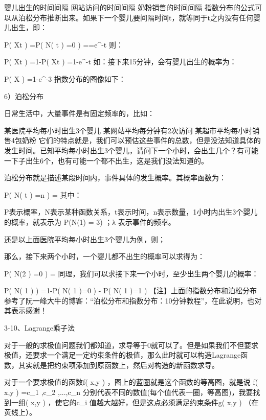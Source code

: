 \documentclass[11pt]{book}
\newcounter{#2}
\newcounter{#2}[#1]
\numberwithin{#2}{#1}
\begin{document}
婴儿出生的时间间隔
网站访问的时间间隔
奶粉销售的时间间隔 
指数分布的公式可以从泊松分布推断出来。如果下一个婴儿要间隔时间t，就等同于t之内没有任何婴儿出生，即：

P\left( X\geq t \right) =P\left( N\left( t \right) =0 \right) ==e^{-\lambda t} 
则：

P\left( X\leq t \right) =1-P\left( X\geq t \right) =1-e^{-\lambda t} 
如：接下来15分钟，会有婴儿出生的概率为：

P\left( X\leq {} \right) =1-e^{-3\cdot {} } 
指数分布的图像如下：


6）泊松分布

日常生活中，大量事件是有固定频率的，比如：

某医院平均每小时出生3个婴儿
某网站平均每分钟有2次访问
某超市平均每小时销售4包奶粉 
它们的特点就是，我们可以预估这些事件的总数，但是没法知道具体的发生时间。已知平均每小时出生3个婴儿，请问下一个小时，会出生几个？有可能一下子出生6个，也有可能一个都不出生，这是我们没法知道的。

泊松分布就是描述某段时间内，事件具体的发生概率。其概率函数为：

P\left( N\left( t \right) =n \right) = 
其中：

P表示概率，N表示某种函数关系，t表示时间，n表示数量，1小时内出生3个婴儿的概率，就表示为 P(N(1) = 3) ；λ 表示事件的频率。

还是以上面医院平均每小时出生3个婴儿为例，则；

那么，接下来两个小时，一个婴儿都不出生的概率可以求得为：

P\left( N\left(2 \right) =0 \right) = 
同理，我们可以求接下来一个小时，至少出生两个婴儿的概率：

P\left( N\left( 1 \right)  \right) =1-P\left( N\left( 1 \right)=0  \right) - P\left( N\left( 1 \right)=1  \right)
【注】上面的指数分布和泊松分布参考了阮一峰大牛的博客：“泊松分布和指数分布：10分钟教程”，在此说明，也对其表示感谢！

3-10、Lagrange乘子法

对于一般的求极值问题我们都知道，求导等于0就可以了。但是如果我们不但要求极值，还要求一个满足一定约束条件的极值，那么此时就可以构造Lagrange函数，其实就是把约束项添加到原函数上，然后对构造的新函数求导。

对于一个要求极值的函数f\left( x,y \right) ，图上的蓝圈就是这个函数的等高图，就是说 f\left( x,y \right) =c_{1} ,c_{2} ,...,c_{n} 分别代表不同的数值(每个值代表一圈，等高图)，我要找到一组\left( x,y \right) ，使它的c_{i} 值越大越好，但是这点必须满足约束条件g\left( x,y \right) （在黄线上）。
\end{document}
